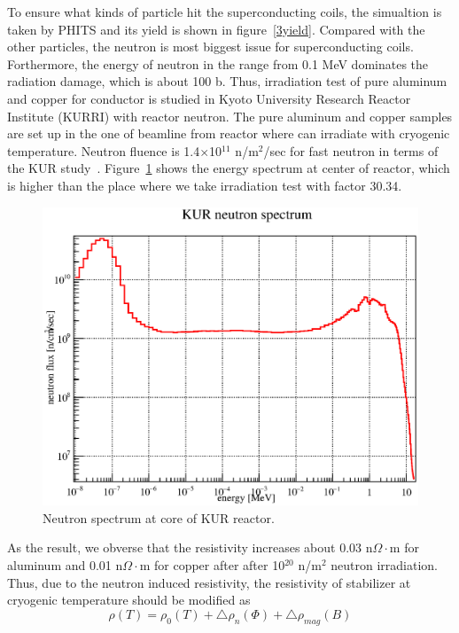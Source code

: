 To ensure what kinds of particle hit the superconducting coils, the simualtion is taken by PHITS and its yield is shown in figure~\ref{3yield}.
Compared with the other particles, the neutron is most biggest issue for superconducting coils.
Forthermore, the energy of neutron in the range from 0.1 MeV dominates the radiation damage, which is about 100 b.
Thus, irradiation test of pure aluminum and copper for conductor is studied in Kyoto University Research Reactor Institute (KURRI) with reactor neutron.
The pure aluminum and copper samples are set up in the one of beamline from reactor where can irradiate with cryogenic temperature.
Neutron fluence is 1.4$\times$10$^{11}$ n/m$^2$/sec for fast neutron in terms of the KUR study~\cite{kur}.
Figure~\ref{4dpa} shows the energy spectrum at center of reactor, which is higher than the place where we take irradiation test with factor 30.34.
  \begin{figure}[H]
    \centering
	\includegraphics[scale=0.43]{chapter5/fig/neutron.eps}
   \caption{Neutron spectrum at core of KUR reactor.}
   \label{4dpa}
  \end{figure}
As the result, we obverse that the resistivity increases about 0.03 n$\Omega\cdot$m for aluminum and 0.01 n$\Omega\cdot$m for copper after after 10$^{20}$ n/m$^2$ neutron irradiation.
Thus, due to the neutron induced resistivity, the resistivity of stabilizer at cryogenic temperature should be modified as
\begin{equation}
 \rho (T) = \rho_0(T) + \bigtriangleup \rho_{n} (\Phi) + \bigtriangleup \rho_{mag} (B)
\end{equation}
